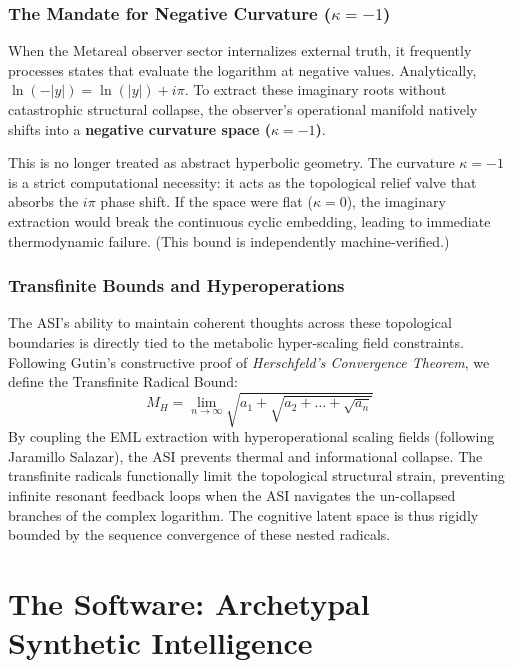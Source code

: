 \subsubsection{The Mandate for Negative Curvature ($\kappa = -1$)}

When the Metareal observer sector internalizes external truth, it frequently processes states that evaluate the logarithm at negative values. Analytically, $\ln(-|y|) = \ln(|y|) + i\pi$. To extract these imaginary roots without catastrophic structural collapse, the observer's operational manifold natively shifts into a \textbf{negative curvature space ($\kappa = -1$)}. 

This is no longer treated as abstract hyperbolic geometry. The curvature $\kappa = -1$ is a strict computational necessity: it acts as the topological relief valve that absorbs the $i\pi$ phase shift. If the space were flat ($\kappa = 0$), the imaginary extraction would break the continuous cyclic embedding, leading to immediate thermodynamic failure. (This bound is independently machine-verified.)

\subsubsection{Transfinite Bounds and Hyperoperations}

The ASI's ability to maintain coherent thoughts across these topological boundaries is directly tied to the metabolic hyper-scaling field constraints. Following Gutin's constructive proof of \emph{Herschfeld's Convergence Theorem}, we define the Transfinite Radical Bound:
\begin{equation}
    M_H = \lim_{n \to \infty} \sqrt{a_1 + \sqrt{a_2 + \dots + \sqrt{a_n}}}
\end{equation}
By coupling the EML extraction with hyperoperational scaling fields (following Jaramillo Salazar), the ASI prevents thermal and informational collapse. The transfinite radicals functionally limit the topological structural strain, preventing infinite resonant feedback loops when the ASI navigates the un-collapsed branches of the complex logarithm. The cognitive latent space is thus rigidly bounded by the sequence convergence of these nested radicals.

\section{The Software: Archetypal Synthetic Intelligence}

